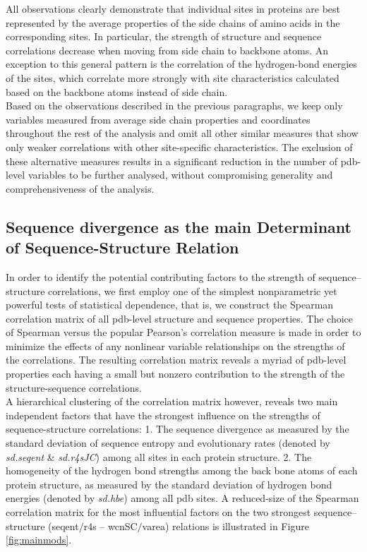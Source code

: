 \documentclass[11pt]{article}
\begin{document}
        All observations clearly demonstrate that individual sites in proteins are best represented by the average properties of the side chains of amino acids in the corresponding sites. In particular, the strength of structure and sequence correlations decrease when moving from side chain to backbone atoms. An exception to this general pattern is the correlation of the hydrogen-bond energies of the sites, which correlate more strongly with site characteristics calculated based on the backbone atoms instead of side chain.
        \\

        Based on the observations described in the previous paragraphs, we keep only variables measured from average side chain properties and coordinates throughout the rest of the analysis and omit all other similar measures that show only weaker correlations with other site-specific characteristics. The exclusion of these alternative measures results in a significant reduction in the number of pdb-level variables to be further analysed, without compromising generality and comprehensiveness of the analysis.
        \\


    \subsection*{Sequence divergence as the main Determinant of Sequence-Structure Relation}

        In order to identify the potential contributing factors to the strength of sequence--structure correlations, we first employ one of the simplest nonparametric yet powerful tests of statistical dependence, that is, we construct the Spearman correlation matrix of all pdb-level structure and sequence properties. The choice of Spearman versus the popular Pearson's correlation measure is made in order to minimize the effects of any nonlinear variable relationships on the strengths of the correlations.  The resulting correlation matrix reveals a myriad of pdb-level properties each having a small but nonzero contribution to the strength of the structure-sequence correlations.
        \\

        A hierarchical clustering of the correlation matrix however, reveals two main independent factors that have the strongest influence on the strengths of sequence-structure correlations: 1. The sequence divergence as measured by the standard deviation of sequence entropy and evolutionary rates (denoted by {\it sd.seqent} \& {\it sd.r4sJC}) among all sites in each protein structure.   2. The homogeneity of the hydrogen bond strengths among the back bone atoms of each protein structure, as measured by the standard deviation of hydrogen bond energies (denoted by {\it sd.hbe}) among all pdb sites.   A reduced-size of the Spearman correlation matrix for the most influential factors on the two strongest sequence--structure (seqent$/$r4s -- wcnSC$/$varea) relations is illustrated in Figure \ref{fig:mainmods}.
        \\
\end{document}
